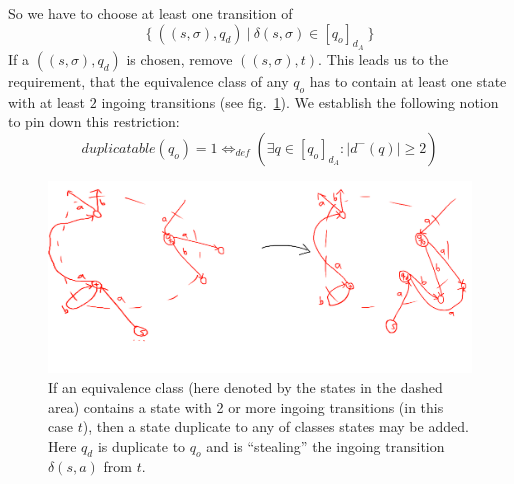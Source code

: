 So we have to choose at least one transition of
\[
	\{\ ((s, \sigma), q_d)\ |\ \delta(s,\sigma) \in [q_o]_{d_A}\ \}
\]
If a $((s, \sigma), q_d)$ is chosen, remove $((s, \sigma), t)$. This leads us to the requirement, that the equivalence class of any $q_o$ has to contain at least one state with at least $2$ ingoing transitions (see fig.~\ref{fig:dfa_add_duplicate_states}). We establish the following notion to pin down this restriction:
\[
	duplicatable(q_o) = 1 \Leftrightarrow_{def} (\exists q \in [q_o]_{d_A}\colon |d^-(q)| \geq 2)
\]
\begin{figure}
	\includegraphics[width=\linewidth]{images/dfa_add_duplicate_states.png}
	\caption{If an equivalence class (here denoted by the states in the dashed area) contains a state with 2 or more ingoing transitions (in this case $t$), then a state duplicate to any of classes states may be added. Here $q_d$ is duplicate to $q_o$ and is ``stealing'' the ingoing transition $\delta(s, a)$ from $t$.}
	\label{fig:dfa_add_duplicate_states}
\end{figure}


